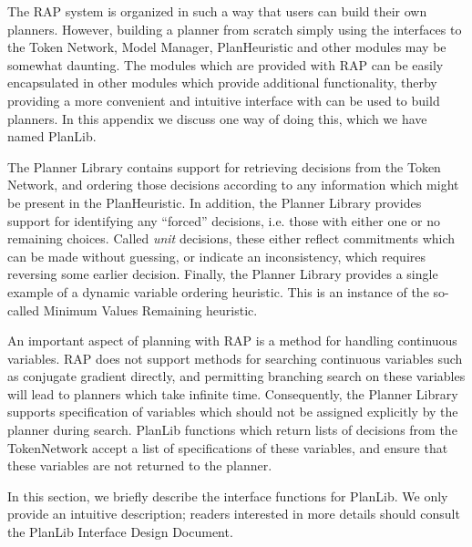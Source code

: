 
The RAP system is organized in such a way that users can build their
own planners.  However, building a planner from scratch simply using the
interfaces to the Token Network, Model Manager, PlanHeuristic and other
modules may be somewhat daunting.  The modules which are provided with RAP can be easily
encapsulated in other modules which provide additional functionality, therby
providing a more convenient and intuitive interface with can be used to
build planners.  In this appendix we discuss one way of doing this,
which we have named PlanLib.

The Planner Library contains 
support for retrieving decisions from the Token Network, and ordering
those decisions according to any information which might be present
in the PlanHeuristic.  In addition, the Planner Library provides support
for identifying any ``forced'' decisions, i.e. those with either one or
no remaining choices.  Called {\em unit} decisions, these either 
reflect commitments which can be made without guessing, or indicate an
inconsistency, which requires reversing some earlier decision.
Finally, the Planner Library provides a single example of a dynamic
variable ordering heuristic.  This is an instance of the so-called
Minimum Values Remaining heuristic.

An important aspect of planning with RAP is a method for handling continuous
variables.  RAP does not support methods for searching continuous variables
such as conjugate gradient directly, and permitting branching search on
these variables will lead to planners which take infinite time.  Consequently,
the Planner Library supports specification of variables which should not be
assigned explicitly by the planner during search.  PlanLib functions which
return lists of decisions from the TokenNetwork accept a list of specifications
of these variables, and ensure that these variables are not returned
to the planner.


In this section, we briefly describe the interface functions for PlanLib.  We only
provide an intuitive description; readers interested in more details should consult
the PlanLib Interface Design Document.

